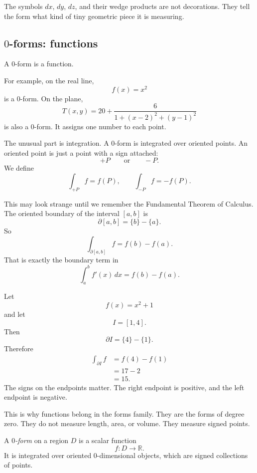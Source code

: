 The symbols \(dx\), \(dy\), \(dz\), and their wedge products are not decorations.  They
tell the form what kind of tiny geometric piece it is measuring.

\subsection{\texorpdfstring{\(0\)}{0}-forms: functions}

A \(0\)-form is a function.

For example, on the real line,
\[
    f(x)=x^2
\]
is a \(0\)-form.  On the plane,
\[
    T(x,y)=20+\frac{6}{1+(x-2)^2+(y-1)^2}
\]
is also a \(0\)-form.  It assigns one number to each point.

The unusual part is integration.  A \(0\)-form is integrated over oriented points.  An
oriented point is just a point with a sign attached:
\[
    +P
    \qquad\text{or}\qquad
    -P.
\]
We define
\[
    \int_{+P} f=f(P),
    \qquad
    \int_{-P} f=-f(P).
\]

This may look strange until we remember the Fundamental Theorem of Calculus.  The
oriented boundary of the interval \([a,b]\) is
\[
    \partial[a,b]=\{b\}-\{a\}.
\]
So
\[
    \int_{\partial[a,b]} f
    =
    f(b)-f(a).
\]
That is exactly the boundary term in
\[
    \int_a^b f'(x)\,dx=f(b)-f(a).
\]

\begin{example}
Let
\[
    f(x)=x^2+1
\]
and let
\[
    I=[1,4].
\]
Then
\[
    \partial I=\{4\}-\{1\}.
\]
Therefore
\[
\begin{aligned}
    \int_{\partial I} f
    &=
    f(4)-f(1)\\
    &=
    17-2\\
    &=
    15.
\end{aligned}
\]
The signs on the endpoints matter.  The right endpoint is positive, and the left
endpoint is negative.
\end{example}

This is why functions belong in the forms family.  They are the forms of degree zero.
They do not measure length, area, or volume.  They measure signed points.

\begin{definition}[\(0\)-form]
A \emph{\(0\)-form} on a region \(D\) is a scalar function
\[
    f:D\to\mathbb R.
\]
It is integrated over oriented \(0\)-dimensional objects, which are signed collections
of points.
\end{definition}

